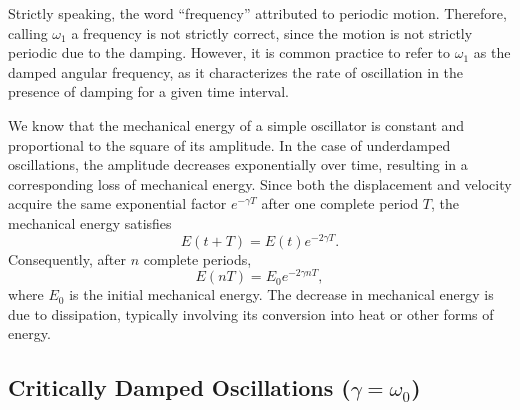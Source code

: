 \documentclass[12pt]{article}
\begin{document}
Strictly speaking, the word ``frequency'' attributed to periodic motion. Therefore, calling $\omega_1$ a frequency is not strictly correct, since the motion is not strictly periodic due to the damping. However, it is common practice to refer to $\omega_1$ as the damped angular frequency, as it characterizes the rate of oscillation in the presence of damping for a given time interval.

We know that the mechanical energy of a simple oscillator is constant and proportional to the square of its amplitude. In the case of underdamped oscillations, the amplitude decreases exponentially over time, resulting in a corresponding loss of mechanical energy. Since both the displacement and velocity acquire
the same exponential factor $e^{-\gamma T}$ after
one complete period $T$, the mechanical energy
satisfies
\begin{equation}
    E(t+T)=E(t)e^{-2\gamma T}.
\end{equation}
Consequently, after $n$ complete periods,
\begin{equation}
    E(nT)=E_0e^{-2\gamma nT},
\end{equation}
where $E_0$ is the initial mechanical energy.
The decrease in mechanical energy is due to
dissipation, typically involving its conversion
into heat or other forms of energy.


\subsection{Critically Damped Oscillations ($\gamma=\omega_0$)}
\end{document}
